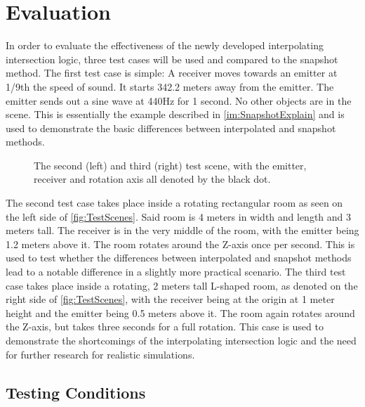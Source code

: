 \chapter{Evaluation}\label{ch:Evaluation}

In order to evaluate the effectiveness of the newly developed interpolating intersection logic,
three test cases will be used and compared to the snapshot method.
\newline
The first test case is simple: A receiver moves towards an emitter at 1/9th the speed of sound.
It starts 342.2 meters away from the emitter.
The emitter sends out a sine wave at 440Hz for 1 second.
No other objects are in the scene.
\newline
This is essentially the example described in \ref{im:SnapshotExplain}
and is used to demonstrate the basic differences between interpolated and snapshot methods.
\newline
\begin{figure}[t!]
    
    \caption{The second (left) and third (right) test scene, with the emitter, receiver and rotation axis all denoted by the black dot.}\label{fig:TestScenes}
\end{figure}
The second test case takes place inside a rotating rectangular room as seen on the left side of \autoref{fig:TestScenes}.
Said room is 4 meters in width and length and 3 meters tall.
The receiver is in the very middle of the room,
with the emitter being 1.2 meters above it.
The room rotates around the Z-axis once per second.
\newline
This is used to test whether the differences between interpolated and snapshot methods
lead to a notable difference in a slightly more practical scenario.
\newline
The third test case takes place inside a rotating, 2 meters tall L-shaped room,
as denoted on the right side of \autoref{fig:TestScenes},
with the receiver being at the origin at 1 meter height and the emitter being 0.5 meters above it.
The room again rotates around the Z-axis, but takes three seconds for a full rotation.
\newline
This case is used to demonstrate the shortcomings of the interpolating intersection logic
and the need for further research for realistic simulations.

\section{Testing Conditions}

